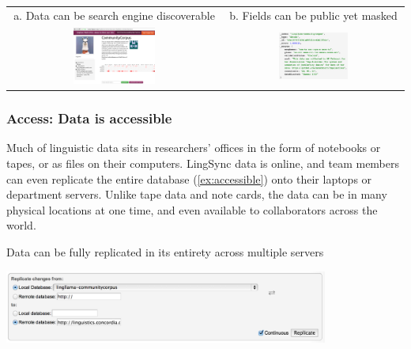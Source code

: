 \documentclass[letterpaper, 12pt, dvips]{mitwpl}
\begin{document}
\begin{exe} 
\ex \label{ex:discoverable}  ~  \\ 
 \begin{tabular}{c c} 
 a. Data can be search engine discoverable & b. Fields can be public yet masked \\
   \includegraphics[width=0.4\textwidth]{discoverable} & 
   \includegraphics[width=0.4\textwidth]{confidential}
\end{tabular}

\end{exe}


\subsubsection{\textbf{Access}: Data is accessible}
 
Much of linguistic data sits in researchers' offices in the form of notebooks or tapes, or as files on their computers.  LingSync data is online, and team members can even replicate the entire database (\ref{ex:accessible}) onto their laptops or department servers. Unlike tape data and note cards, the data can be in many physical locations at one time, and even available to collaborators across the world. 

\begin{exe} 
\ex Data can be fully replicated in its entirety across multiple servers

 \centering
   \includegraphics[width=0.8\textwidth]{accessible}

\label{ex:accessible}
\end{exe}
\end{document}
